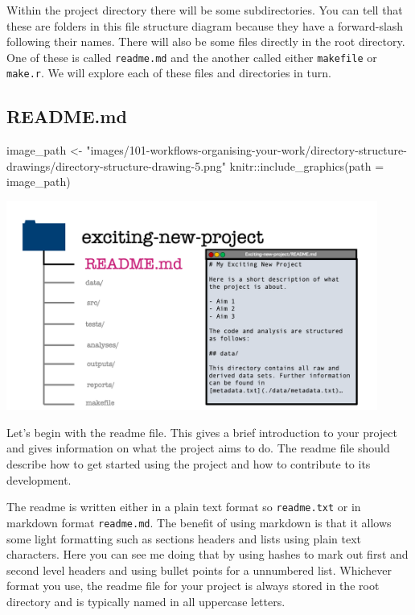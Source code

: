 \documentclass[
  letterpaper,
  DIV=11,
  numbers=noendperiod]{scrreprt}
\newenvironment{Shaded}{\begin{snugshade}}{\end{snugshade}}
\newcommand{\AttributeTok}[1]{\textcolor[rgb]{0.40,0.45,0.13}{#1}}
\newcommand{\FunctionTok}[1]{\textcolor[rgb]{0.28,0.35,0.67}{#1}}
\newcommand{\NormalTok}[1]{\textcolor[rgb]{0.00,0.23,0.31}{#1}}
\newcommand{\OtherTok}[1]{\textcolor[rgb]{0.00,0.23,0.31}{#1}}
\newcommand{\SpecialCharTok}[1]{\textcolor[rgb]{0.37,0.37,0.37}{#1}}
\newcommand{\StringTok}[1]{\textcolor[rgb]{0.13,0.47,0.30}{#1}}
\begin{document}
Within the project directory there will be some subdirectories. You can
tell that these are folders in this file structure diagram because they
have a forward-slash following their names. There will also be some
files directly in the root directory. One of these is called
\texttt{readme.md} and the another called either \texttt{makefile} or
\texttt{make.r}. We will explore each of these files and directories in
turn.

\subsection{README.md}\label{readme.md}

\begin{Shaded}
\begin{Highlighting}[]
\NormalTok{image\_path }\OtherTok{\textless{}{-}} \StringTok{"images/101{-}workflows{-}organising{-}your{-}work/directory{-}structure{-}drawings/directory{-}structure{-}drawing{-}5.png"}
\NormalTok{knitr}\SpecialCharTok{::}\FunctionTok{include\_graphics}\NormalTok{(}\AttributeTok{path =}\NormalTok{ image\_path)}
\end{Highlighting}
\end{Shaded}

\includegraphics[width=4.8in,height=\textheight]{images/101-workflows-organising-your-work/directory-structure-drawings/directory-structure-drawing-5.png}

Let's begin with the readme file. This gives a brief introduction to
your project and gives information on what the project aims to do. The
readme file should describe how to get started using the project and how
to contribute to its development.

The readme is written either in a plain text format so
\texttt{readme.txt} or in markdown format \texttt{readme.md}. The
benefit of using markdown is that it allows some light formatting such
as sections headers and lists using plain text characters. Here you can
see me doing that by using hashes to mark out first and second level
headers and using bullet points for a unnumbered list. Whichever format
you use, the readme file for your project is always stored in the root
directory and is typically named in all uppercase letters.
\end{document}
